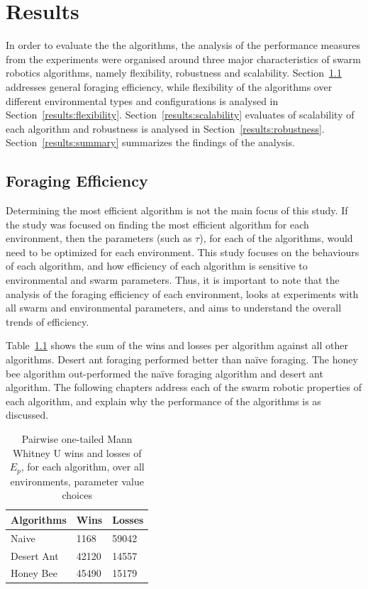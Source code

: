 \chapter{Results}
\label{chap:results}

In order to evaluate the the algorithms, the analysis of the performance measures from the experiments were organised around three major characteristics of swarm robotics algorithms, namely flexibility, robustness and scalability. Section~\ref{results:efficiency} addresses general foraging efficiency, while flexibility of the algorithms over different environmental types and configurations is analysed in Section~\ref{results:flexibility}. Section~\ref{results:scalability} evaluates of scalability of each algorithm and robustness is analysed in Section~\ref{results:robustness}. Section~\ref{results:summary} summarizes the findings of the analysis.

\section{Foraging Efficiency}
\label{results:efficiency}

Determining the most efficient algorithm is not the main focus of this study. If the study was focused on finding the most efficient algorithm for each environment, then the parameters (such as $\tau$), for each of the algorithms, would need to be optimized for each environment. This study focuses on the behaviours of each algorithm, and how efficiency of each algorithm is sensitive to environmental and swarm parameters. Thus, it is important to note that the analysis of the foraging efficiency of each environment, looks at experiments with all swarm and environmental parameters, and aims to understand the overall trends of efficiency.

Table~\ref{summarytable} shows the sum of the wins and losses per algorithm against all other algorithms. Desert ant foraging performed better than na\"ive foraging. The honey bee algorithm out-performed the na\"ive foraging algorithm and desert ant algorithm. The following chapters address each of the swarm robotic properties of each algorithm, and explain why the performance of the algorithms is as discussed.


\begin{table}[]
\centering
\caption{Pairwise one-tailed Mann Whitney U wins and losses of $E_p$, for each algorithm, over all environments, parameter value choices }
\label{summarytable}
\begin{tabular}{@{}lll@{}}
\toprule
\textbf{Algorithms} & \textbf{Wins} & \textbf{Losses} \\ \midrule
Naive               & 1168          & 59042           \\
Desert Ant          & 42120         & 14557           \\
Honey Bee           & 45490         & 15179           \\ \bottomrule
\end{tabular}
\end{table}

